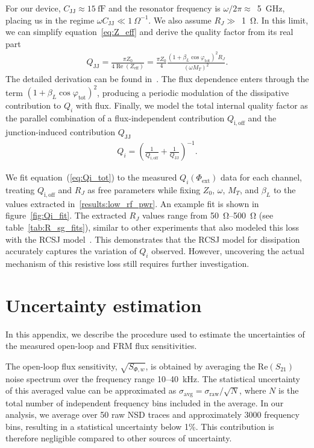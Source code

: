 \documentclass[10pt]{iopart}
\begin{document}
For our device, $C_{\mathrm{JJ}} \approx 15~\mathrm{fF}$ and the resonator frequency is $\omega/2\pi \approx$~\qty{5}{\GHz}, placing us in the regime $\omega C_{\mathrm{JJ}} \ll 1~\Omega^{-1}$. We also assume $R_J \gg$~\qty{1}{\ohm}. In this limit, we can simplify equation~\eqref{eq:Z_eff} and derive the quality factor from its real part
\begin{gather}
Q_{\mathrm{JJ}} =
\frac{\pi Z_0}{4 \operatorname{Re}(Z_{\mathrm{eff}})}
=
\frac{\pi Z_0}{4}
\frac{(1 + \beta_L \cos \varphi_{\mathrm{tot}})^2 R_J}
{(\omega M_T)^2}.
\label{eq:QJJ}
\end{gather}
The detailed derivation can be found in~\cite{mates_microwave_2011}. The flux dependence enters through the term $(1 + \beta_L \cos \varphi_{\mathrm{tot}})^2$, producing a periodic modulation of the dissipative contribution to $Q_i$ with flux. Finally, we model the total internal quality factor as the parallel combination of a flux-independent contribution $Q_{\mathrm{i,off}}$ and the junction-induced contribution $Q_{\mathrm{JJ}}$ ~\cite{kempf_design_2017}
\begin{gather}
Q_i =
\left(
\frac{1}{Q_{\mathrm{i,off}}}
+
\frac{1}{Q_{\mathrm{JJ}}}
\right)^{-1}.
\label{eq:Qi_tot}
\end{gather}

We fit equation~(\ref{eq:Qi_tot}) to the measured $Q_i(\Phi_{\mathrm{ext}})$ data for each channel, treating $Q_{\mathrm{i,off}}$ and $R_J$ as free parameters while fixing $Z_0$, $\omega$, $M_T$, and $\beta_L$ to the values extracted in~\cref{results:low_rf_pwr}. An example fit is shown in figure~\ref{fig:Qi_fit}. The extracted $R_J$ values range from \qty{50}{\ohm}--\qty{500}{\ohm} (see table~\ref{tab:R_sg_fits}), similar to other experiments that also modeled this loss with the RCSJ model~\cite{kempf_design_2017}. This demonstrates that the RCSJ model for dissipation accurately captures the variation of $Q_i$ observed. However, uncovering the actual mechanism of this resistive loss still requires further investigation.



\section{Uncertainty estimation} \label{appx:uncertainties}
In this appendix, we describe the procedure used to estimate the uncertainties of the measured open-loop and FRM flux sensitivities.

The open-loop flux sensitivity, $\sqrt{S_{\Phi,w}}$, is obtained by averaging the $\mathrm{Re}(S_{21})$ noise spectrum over the frequency range 10--\qty{40}{\kHz}. The statistical uncertainty of this averaged value can be approximated as \mbox{$\sigma_{\mathrm{avg}} = \sigma_{\mathrm{raw}}/\sqrt{N}$}, where $N$ is the total number of independent frequency bins included in the average. In our analysis, we average over 50 raw NSD traces and approximately 3000 frequency bins, resulting in a statistical uncertainty below 1\%. This contribution is therefore negligible compared to other sources of uncertainty.
\end{document}
